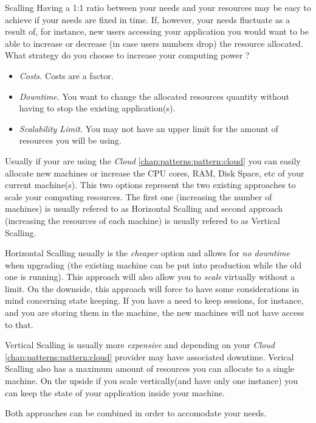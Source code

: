 \begin{pattern}{Scalling}
    \context
    Having a 1:1 ratio between your needs and your resources may be easy to achieve if your needs are fixed in time. If, however, your needs fluctuate as a result of, for instance, new users accessing your application you would want to be able to increase or decrease (in case users numbers drop) the resource allocated.
    \problem
    What strategy do you choose to increase your computing power ?
    \forces
    \begin{itemize}
        \item \textit{Costs.} Costs are a factor.
        \item \textit{Downtime.} You want to change the allocated resources quantity without having to stop the existing application(s).
        \item \textit{Scalability Limit.} You may not have an upper limit for the amount of resources you will be using.
    \end{itemize}

    \solution
        Usually if your are using the \textit{Cloud} \ref{chap:patterns:pattern:cloud} you can easily allocate new machines or increase the CPU cores, RAM, Disk Space, etc of your current machine(s). This two options represent the two existing approaches to scale your computing resources.
        The first one (increasing the number of machines) is usually refered to as Horizontal Scalling and second approach (increasing the resources of each machine) is usually refered to as Vertical Scalling.

        Horizontal Scalling usually is the \textit{cheaper} option and allows for \textit{no downtime} when upgrading (the existing machine can be put into production while the old one is running). This approach will also allow you to \textit{scale} virtually without a limit. On the downside, this approach will force to have some considerations in mind concerning state keeping. If you have a need to keep sessions, for instance, and you are storing them in the machine, the new machines will not have access to that.

        Vertical Scalling is usually more \textit{expensive} and depending on your \textit{Cloud} \ref{chap:patterns:pattern:cloud} provider may have associated downtime. Verical Scalling also has a maximum amount of resources you can allocate to a single machine. On the upside if you scale vertically(and have only one instance) you can keep the state of your application inside your machine.

        Both approaches can be combined in order to accomodate your needs.
\end{pattern}


















